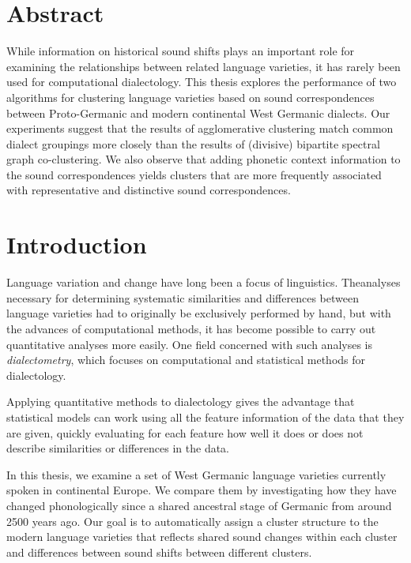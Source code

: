 \documentclass[a4paper]{article}
\begin{document}

\newpage
% 


\newpage
\section*{Abstract}
While information on historical sound shifts
plays an important role for examining
the relationships between related language varieties,
it has rarely been used for computational dialectology.
This thesis explores the performance of two algorithms
for clustering language varieties
based on sound correspondences between Proto-Germanic
and modern continental West Germanic dialects.
Our experiments suggest that the results of agglomerative clustering
match common dialect groupings more closely
than the results of (divisive) bipartite spectral graph co-clustering.
We also observe that adding phonetic context information
to the sound correspondences yields clusters
that are more frequently associated with representative and distinctive
sound correspondences.

\newpage
\tableofcontents
\newpage
\listoftables
\listoffigures
\newpage


\section{Introduction}

Language variation and change have long been a focus of linguistics.
The\linebreak analyses necessary for determining
systematic similarities and differences between language varieties
had to originally be exclusively performed by hand,
but with the advances of computational methods,
it has become possible to carry out quantitative analyses more easily.
One field concerned with such analyses is \textit{dialectometry},
which focuses on computational and statistical methods for dialectology.

Applying quantitative methods to dialectology gives the advantage
that statistical models can work using all the feature
information of the data that they are given,
quickly evaluating for each feature how well it does or does not
describe similarities or differences in the data.

In this thesis, we examine a set of West Germanic language varieties
currently spoken in continental Europe.
We compare them by investigating how they have changed phonologically
since a shared ancestral stage of Germanic from around 2500 years ago.
Our goal is to automatically assign a cluster structure to the
modern language varieties that reflects shared sound changes
within each cluster and differences between sound shifts between different clusters.
\end{document}
